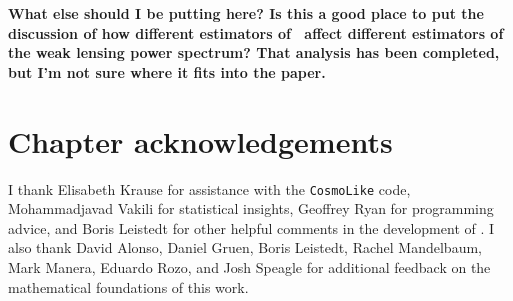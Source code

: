 \textbf{What else should I be putting here?  
	Is this a good place to put the discussion of how different estimators of \Nz\ affect different estimators of the weak lensing power spectrum?  
	That analysis has been completed, but I'm not sure where it fits into the paper.}

\section*{Chapter acknowledgements}

I thank Elisabeth Krause for assistance with the \texttt{CosmoLike} code, Mohammadjavad Vakili for statistical insights, Geoffrey Ryan for programming advice, and Boris Leistedt for other helpful comments in the development of \Chippr.
I also thank David Alonso, Daniel Gruen, Boris Leistedt, Rachel Mandelbaum, Mark Manera, Eduardo Rozo, and Josh Speagle for additional feedback on the mathematical foundations of this work.
